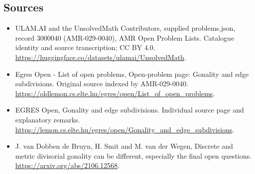 \documentclass[11pt,a4paper]{article}
\begin{document}
\subsection{Sources}
\begin{itemize}
\item[S1] ULAM.AI and the UnsolvedMath Contributors, supplied problems.json, record 3000040 (AMR-029-0040), AMR Open Problem Lists. Catalogue identity and source transcription; CC BY 4.0.
\url{https://huggingface.co/datasets/ulamai/UnsolvedMath}.
\item[S2] Egres Open - List of open problems, Open-problem page: Gonality and edge subdivisions. Original source indexed by AMR-029-0040.
\url{https://oldlemon.cs.elte.hu/egres/open/List_of_open_problems}.
\item[S3] EGRES Open, Gonality and edge subdivisions. Individual source page and explanatory remarks.
\url{https://lemon.cs.elte.hu/egres/open/Gonality_and_edge_subdivisions}.
\item[S4] J. van Dobben de Bruyn, H. Smit and M. van der Wegen, Discrete and metric divisorial gonality can be different, especially the final open questions.
\url{https://arxiv.org/abs/2106.12568}.
\end{itemize}
\end{document}

